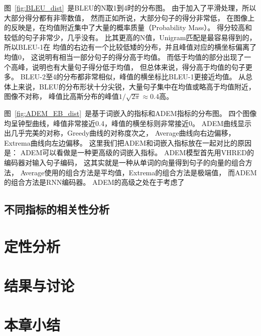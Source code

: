 图~\ref{fig:BLEU_dist}~是BLEU的N取1到4时的分布图。
由于加入了平滑处理，所以大部分得分都有非零数值，
然而正如\cite{HowNot}所说，大部分句子的得分非常低，
在图像上的反映是，在均值附近集中了大量的概率质量（Probability Mass）。
得分较高和较低的句子非常少，几乎没有。
比其更高的N值，Unigram匹配是最容易得到的，所以BLEU-1在
均值的右边有一个比较低矮的分布，并且峰值对应的横坐标偏离了均值0，
这说明有相当一部分句子的得分高于均值。
而低于均值的部分出现了一个高峰，说明也有大量句子得分低于均值，
但总体来说，得分高于均值的句子更多。
BLEU-2至4的分布都非常相似，峰值的横坐标比BLEU-1更接近均值。
从总体上来说，BLEU的分布形状十分尖锐，大量句子集中在均值或略高于均值附近，
图像不对称， 峰值比高斯分布的峰值$1 / \sqrt{2 \pi} \approx 0.4$高。


图~\ref{fig:ADEM_EB_dist}~是基于词嵌入的指标和ADEM指标的分布图。
四个图像均呈钟型曲线，峰值非常接近0.4，峰值的横坐标则非常接近0。
ADEM曲线显示出几乎完美的对称，Greedy曲线的对称度次之，
Average曲线向右边偏移，Extrema曲线向左边偏移。
这里我们把ADEM和词嵌入指标放在一起对比的原因是：
ADEM可以看做是一种更高级的词嵌入指标。
ADEM模型首先用VHRED的编码器对输入句子编码，
这其实就是一种从单词的向量得到句子的向量的组合方法，
Average使用的组合方法是平均值，Extrema的组合方法是极端值，
而ADEM的组合方法是RNN编码器。
ADEM的高级之处在于考虑了






\subsection{不同指标的相关性分析}\label{subsec:metric_correlation}

\section{定性分析}\label{sec:qualitative_analysis}

\section{结果与讨论}\label{sec:result_and_discussion}

\section{本章小结}\label{sec:experiment_conclusion}
